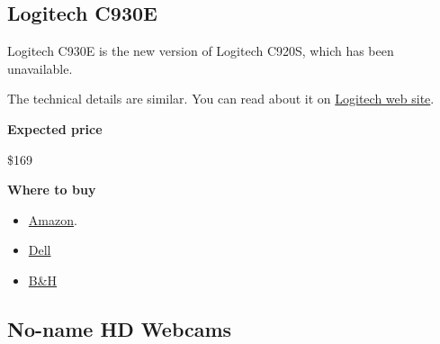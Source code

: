 \subsection{Logitech C930E}
\label{sec:equipment::logitech-930}
\begin{gram}
\label{grm:equipment::logitech-930::main}
Logitech C930E is the new version of Logitech C920S, which has been unavailable.

The technical details are similar.  You can read about it on
%
\href{https://www.logitech.com/en-us/product/c930e-webcam}{Logitech web site}.

\textbf{Expected price}

\$169

\textbf{Where to buy}

\begin{itemize}
\item
\href{https://www.amazon.com/Logitech-C930e-1080P-Video-Webcam/dp/B00CRJWW2G}{Amazon}.
\item 
\href{https://www.dell.com/en-ca/work/shop/logitech-c930e-hd-webcam/apd/a6880908/pc-accessories}{Dell}
\item
\href{https://www.bhphotovideo.com/c/product/977620-REG/logitech_960_000971_c930e_webcam_usb.html}{B\&H}
\end{itemize}

\end{gram}

\subsection{No-name HD Webcams}
\label{sec:equipment::no-name}

